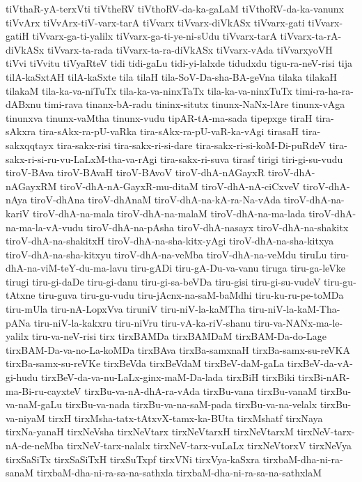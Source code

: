 {tiVthaR-yA-terxVti
tiVtheRV
tiVthoRV-da-ka-gaLaM
tiVthoRV-da-ka-vanunx
tiVvArx
tiVvArx-tiV-varx-tarA
tiVvarx
tiVvarx-diVkASx
tiVvarx-gati
tiVvarx-gatiH
tiVvarx-ga-ti-yalilx
tiVvarx-ga-ti-ye-ni-sUdu
tiVvarx-tarA
tiVvarx-ta-rA-diVkASx
tiVvarx-ta-rada
tiVvarx-ta-ra-diVkASx
tiVvarx-vAda
tiVvarxyoVH
tiVvi
tiVvitu
tiVyaRteV
tidi
tidi-gaLu
tidi-yi-lalxde
tidudxdu
tigu-ra-neV-risi
tija
tilA-kaSxtAH
tilA-kaSxte
tila
tilaH
tila-SoV-Da-sha-BA-geVna
tilaka
tilakaH
tilakaM
tila-ka-va-niTuTx
tila-ka-va-ninxTaTx
tila-ka-va-ninxTuTx
timi-ra-ha-ra-dABxnu
timi-rava
tinanx-bA-radu
tininx-situtx
tinunx-NaNx-lAre
tinunx-vAga
tinunxva
tinunx-vaMtha
tinunx-vudu
tipAR-tA-ma-sada
tipepxge
tiraH
tira-sAkxra
tira-sAkx-ra-pU-vaRka
tira-sAkx-ra-pU-vaR-ka-vAgi
tirasaH
tira-sakxqqtayx
tira-sakx-risi
tira-sakx-ri-si-dare
tira-sakx-ri-si-koM-Di-puRdeV
tira-sakx-ri-si-ru-vu-LaLxM-tha-va-rAgi
tira-sakx-ri-suva
tirasf
tirigi
tiri-gi-su-vudu
tiroV-BAva
tiroV-BAvaH
tiroV-BAvoV
tiroV-dhA-nAGayxR
tiroV-dhA-nAGayxRM
tiroV-dhA-nA-GayxR-mu-ditaM
tiroV-dhA-nA-ciCxveV
tiroV-dhA-nAya
tiroV-dhAna
tiroV-dhAnaM
tiroV-dhA-na-kA-ra-Na-vAda
tiroV-dhA-na-kariV
tiroV-dhA-na-mala
tiroV-dhA-na-malaM
tiroV-dhA-na-ma-lada
tiroV-dhA-na-ma-la-vA-vudu
tiroV-dhA-na-pAsha
tiroV-dhA-nasayx
tiroV-dhA-na-shakitx
tiroV-dhA-na-shakitxH
tiroV-dhA-na-sha-kitx-yAgi
tiroV-dhA-na-sha-kitxya
tiroV-dhA-na-sha-kitxyu
tiroV-dhA-na-veMba
tiroV-dhA-na-veMdu
tiruLu
tiru-dhA-na-viM-teY-du-ma-lavu
tiru-gADi
tiru-gA-Du-va-vanu
tiruga
tiru-ga-leVke
tirugi
tiru-gi-daDe
tiru-gi-danu
tiru-gi-sa-beVDa
tiru-gisi
tiru-gi-su-vudeV
tiru-gu-tAtxne
tiru-guva
tiru-gu-vudu
tiru-jAcnx-na-saM-baMdhi
tiru-ku-ru-pe-toMDa
tiru-mUla
tiru-nA-LopxVva
tiruniV
tiru-niV-la-kaMTha
tiru-niV-la-kaM-Tha-pANa
tiru-niV-la-kakxru
tiru-niVru
tiru-vA-ka-riV-shanu
tiru-va-NANx-ma-le-yalilx
tiru-va-neV-risi
tirx
tirxBAMDa
tirxBAMDaM
tirxBAM-Da-do-Lage
tirxBAM-Da-va-no-La-koMDa
tirxBAva
tirxBa-samxnaH
tirxBa-samx-su-reVKA
tirxBa-samx-su-reVKe
tirxBeVda
tirxBeVdaM
tirxBeV-daM-gaLa
tirxBeV-da-vA-gi-hudu
tirxBeV-da-va-nu-LaLx-ginx-maM-Da-lada
tirxBiH
tirxBiki
tirxBi-nAR-ma-Bi-ru-cayxteV
tirxBu-va-nA-dhA-ra-vAda
tirxBu-vana
tirxBu-vanaM
tirxBu-va-naM-gaLu
tirxBu-va-nada
tirxBu-va-na-saM-pada
tirxBu-va-na-velalx
tirxBu-va-niyaM
tirxH
tirxMsha-tatx-tAtxvX-tamx-ka-BUta
tirxMshatf
tirxNaya
tirxNa-yanaH
tirxNeVsha
tirxNeVtarx
tirxNeVtarxH
tirxNeVtarxM
tirxNeV-tarx-nA-de-neMba
tirxNeV-tarx-nalalx
tirxNeV-tarx-vuLaLx
tirxNeVtorxV
tirxNeVya
tirxSaSiTx
tirxSaSiTxH
tirxSuTxpf
tirxVNi
tirxVya-kaSxra
tirxbaM-dha-ni-ra-sanaM
tirxbaM-dha-ni-ra-sa-na-sathxla
tirxbaM-dha-ni-ra-sa-na-sathxlaM
}
